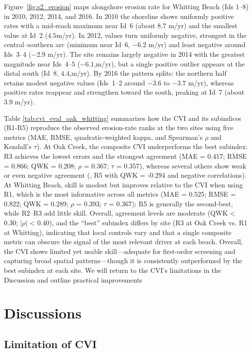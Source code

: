 Figure~\ref{fig:s2_erosion} maps alongshore erosion rate for Whitting Beach (Ids
1–8) in 2010, 2012, 2014, and 2016. In 2010 the shoreline shows uniformly
positive rates with a mid-reach maximum near Id~6 (about $8.7$ m/yr) and the
smallest value at Id~2 ($4.5$m/yr). In 2012, values turn uniformly negative,
strongest in the central–southern arc (minimum near Id~6, $-6.2$ m/yr) and least
negative around Ids~3–4 ($-2.9$ m/yr). The site remains largely negative in 2014
with the greatest magnitude near Ids~4–5 ($-6.1$,m/yr), but a single positive
outlier appears at the distal south (Id~8, $4.4$,m/yr). By 2016 the pattern
splits: the northern half retains modest negative values (Ids~1–2 around $-3.6$
to $-3.7$ m/yr), whereas positive rates reappear and strengthen toward the
south, peaking at Id~7 (about $3.9$ m/yr).



Table \ref{tab:cvi_eval_oak_whitting} summarizes how the CVI and its subindices
(R1-R5) reproduce the observed erosion-rate ranks at the two sites using five
metrics (MAE, RMSE, quadratic-weighted kappa, and Spearman’s $\rho$ and
Kendall’s $\tau$).  At Oak Creek, the composite CVI underperforms the best
subindex: R3 achieves the lowest errors and the strongest agreement (MAE =
0.417; RMSE = 0.866; QWK = 0.208; $\rho$ = 0.367; $\tau$ = 0.357), whereas
several others show weak or even negative agreement (\eg, R5 with QWK = -0.294
and negative correlations). At Whitting Beach, skill is modest but improves
relative to the CVI when using R1, which is the most informative across all
metrics (MAE = 0.525; RMSE = 0.822; QWK = 0.289; $\rho$ = 0.393; $\tau$ =
0.367); R5 is generally the second-best, while R2–R3 add little skill. Overall,
agreement levels are moderate (QWK < 0.30; $|\rho|$ < 0.40), and the “best”
subindex differs by site (R3 at Oak Creek vs. R1 at Whitting), indicating that
local controls vary and that a single composite metric can obscure the signal of
the most relevant driver at each beach. Overall, the CVI shows limited yet
usable skill—adequate for first-order screening and capturing broad spatial
patterns—though it is consistently outperformed by the best subindex at each
site. We will return to the CVI’s limitations in the Discussion and outline
practical improvements
\section{Discussions}
\label{c5_Discussions}

\subsection{Limitation of CVI}
\label{Limitation of CVI}

